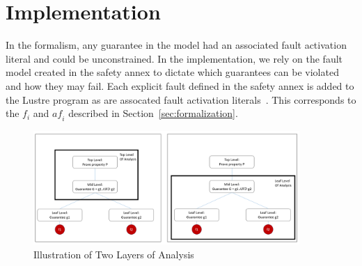 \section{Implementation}
\label{sec:impl}
In the formalism, any guarantee in the model had an associated fault activation literal and could be unconstrained. In the implementation, we rely on the fault model created in the safety annex to dictate which guarantees can be violated and how they may fail. Each explicit fault defined in the safety annex is added to the Lustre program as are assocated fault activation literals~\cite{Stewart17:IMBSA,stewart2020safety}. This corresponds to the $f_i$ and $\mathit{af}_i$ described in Section~\ref{sec:formalization}. 

\begin{figure}[h!]
	\begin{center}
		\includegraphics[width=0.9\textwidth]{images/twoLevels.PNG}
	\end{center}
	\vspace{-2em}
	\caption{Illustration of Two Layers of Analysis}
	\label{fig:layers}
\end{figure}

